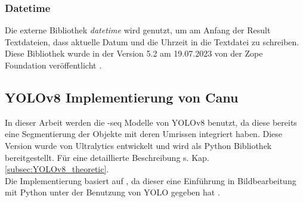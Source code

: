 		\subsubsection*{Datetime}{
			Die externe Bibliothek \textit{datetime} wird genutzt, um am Anfang der Result Textdateien, dass aktuelle Datum und die Uhrzeit in die Textdatei zu schreiben. Diese Bibliothek wurde in der Version 5.2 am 19.07.2023 von der Zope Foundation veröffentlicht \citep{Zope2023}.
		}
		\subsection{YOLOv8 Implementierung von Canu}
		{ \label{YOLOv8_canu}
		In dieser Arbeit werden die \glqq-seq\grqq{} Modelle von YOLOv8 benutzt, da diese bereits eine Segmentierung der Objekte mit deren Umrissen integriert haben. Diese Version wurde von Ultralytics entwickelt und wird als Python Bibliothek bereitgestellt. Für eine detaillierte Beschreibung s. Kap. \ref{subsec:YOLOv8_theoretic}. \\
		Die Implementierung basiert auf \citeauthor{Canu_pysource}, da dieser eine Einführung in Bildbearbeitung mit Python unter der Benutzung von YOLO gegeben hat \citep{Canu_pysource}.
		}


	
	




	

